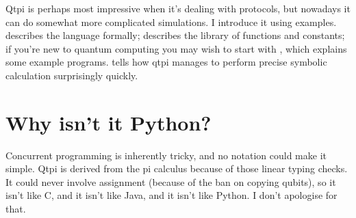 Qtpi is perhaps most impressive when it's dealing with protocols, but nowadays it can do somewhat more complicated simulations. I introduce it using examples.  describes the language formally;  describes the library of functions and constants; if you're new to quantum computing you may wish to start with , which explains some example programs.  tells how qtpi manages to perform precise symbolic calculation surprisingly quickly.

\section{Why isn't it Python?}

Concurrent programming is inherently tricky, and no notation could make it simple. Qtpi is derived from the pi calculus because of those linear typing checks. It could never involve assignment (because of the ban on copying qubits), so it isn't like C, and it isn't like Java, and it isn't like Python. I don't apologise for that.
